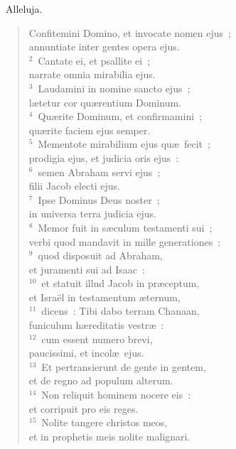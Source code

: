~\lettrine[lines=10,image=true,loversize=0.05,lraise=-0.03]{A}{}lleluja. \begin{flushleft}\begin{verse}\vspace{6pt}Confitemini Domino, et invocate nomen ejus~;\\ annuntiate inter gentes opera ejus.\\
${}^{2}$~Cantate ei, et psallite ei~;\\ narrate omnia mirabilia ejus.\\
${}^{3}$~Laudamini in nomine sancto ejus~;\\ l\ae tetur cor qu\ae rentium Dominum.\\
${}^{4}$~Qu\ae rite Dominum, et confirmamini~;\\ qu\ae rite faciem ejus semper.\\
${}^{5}$~Mementote mirabilium ejus qu\ae\ fecit~;\\ prodigia ejus, et judicia oris ejus~:\\
${}^{6}$~semen Abraham servi ejus~;\\ filii Jacob electi ejus.\\
${}^{7}$~Ipse Dominus Deus noster~;\\ in universa terra judicia ejus.\\
${}^{8}$~Memor fuit in s\ae culum testamenti sui~;\\ verbi quod mandavit in mille generationes~:\\
${}^{9}$~quod disposuit ad Abraham,\\ et juramenti sui ad Isaac~:\\
${}^{10}$~et statuit illud Jacob in pr\ae ceptum,\\ et Isra\"el in testamentum \ae ternum,\\
${}^{11}$~dicens~: Tibi dabo terram Chanaan,\\ funiculum h\ae reditatis vestr\ae~:\\
${}^{12}$~cum essent numero brevi,\\ paucissimi, et incol\ae\ ejus.\\
${}^{13}$~Et pertransierunt de gente in gentem,\\ et de regno ad populum alterum.\\
${}^{14}$~Non reliquit hominem nocere eis~:\\ et corripuit pro eis reges.\\
${}^{15}$~Nolite tangere christos meos,\\ et in prophetis meis nolite malignari.\\

\end{verse}
\end{flushleft}
